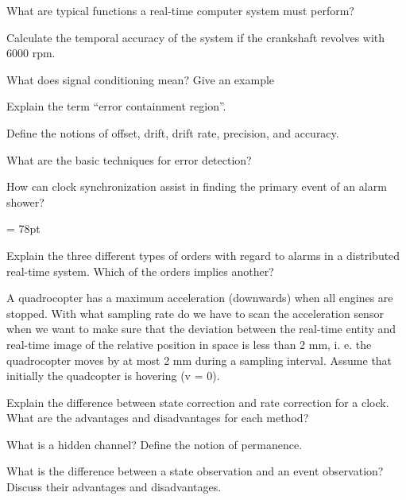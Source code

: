 
What are typical functions a real-time computer system must perform?
\begin{unteraufgaben}
\item Calculate the temporal accuracy of the system if the crankshaft revolves with 6000 rpm.
\end{unteraufgaben}


 What does signal conditioning mean? Give an example


 Explain the term “error containment region”.

 Define the notions of offset, drift, drift rate, precision, and accuracy.


What are the basic techniques for error detection?


How can clock synchronization assist in finding the primary event of an alarm shower?

\pagebreak
\headheight = 78pt


Explain the three different types of orders with regard to alarms in a distributed real-time
system. Which of the orders implies another?



A quadrocopter has a maximum acceleration (downwards) when all engines are stopped.
With what sampling rate do we have to scan the acceleration sensor when we want to make
sure that the deviation between the real-time entity and real-time image of the relative
position in space is less than 2 mm, i. e. the quadrocopter moves by at most 2 mm during a
sampling interval. Assume that initially the quadcopter is hovering (v = 0).



Explain the difference between state correction and rate correction for a clock. What are the
advantages and disadvantages for each method?


What is a hidden channel? Define the notion of permanence.

\pagebreak



What is the difference between a state observation and an event observation? Discuss their
advantages and disadvantages.




